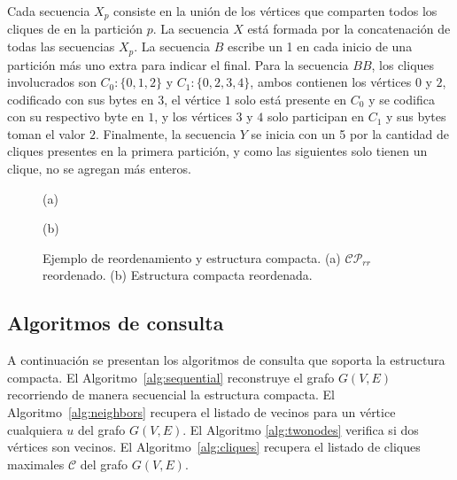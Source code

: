 Cada secuencia $X_{p}$ consiste en la unión de los vértices que comparten todos los cliques de en la partición $p$. La secuencia $X$ está formada por la concatenación de todas las secuencias $X_{p}$. La secuencia $B$ escribe un 1 en cada inicio de una partición más uno extra para indicar el final. Para la secuencia $BB$, los cliques involucrados son $C_{0}: \{0, 1, 2\}$ y $C_{1}: \{0, 2, 3, 4\}$, ambos contienen los vértices $0$ y $2$, codificado con sus bytes en $3$, el vértice $1$ solo está presente en $C_{0}$ y se codifica con su respectivo byte en $1$, y los vértices $3$ y $4$ solo participan en $C_{1}$ y sus bytes toman el valor $2$. Finalmente, la secuencia $Y$ se inicia con un  5 por la cantidad de cliques presentes en la primera partición, y como las siguientes solo tienen un clique, no se agregan más enteros.

\begin{figure}
	\centering
	\begin{minipage}{0.45\textwidth}
		\centering
		
	
		(a)
	\end{minipage}
	\begin{minipage}{0.45\textwidth}
		\centering
		
		
		(b)
	\end{minipage}
	
	\caption{Ejemplo de reordenamiento y estructura compacta. (a) $\mathcal{C}\mathcal{P}_{rr}$ reordenado. (b) Estructura compacta reordenada.}
	\label{fig:compactStructure}
\end{figure}



\subsection{Algoritmos de consulta}
A continuación se presentan los algoritmos de consulta que soporta la estructura compacta. El Algoritmo~\ref{alg:sequential} reconstruye el grafo $G(V, E)$ recorriendo de manera secuencial la estructura compacta. El Algoritmo~\ref{alg:neighbors} recupera el listado de vecinos para un vértice cualquiera $u$ del grafo $G(V, E)$. El Algoritmo \ref{alg:twonodes} verifica si dos vértices son vecinos. El Algoritmo~\ref{alg:cliques} recupera el listado de cliques maximales $\mathcal{C}$ del grafo $G(V, E)$.

